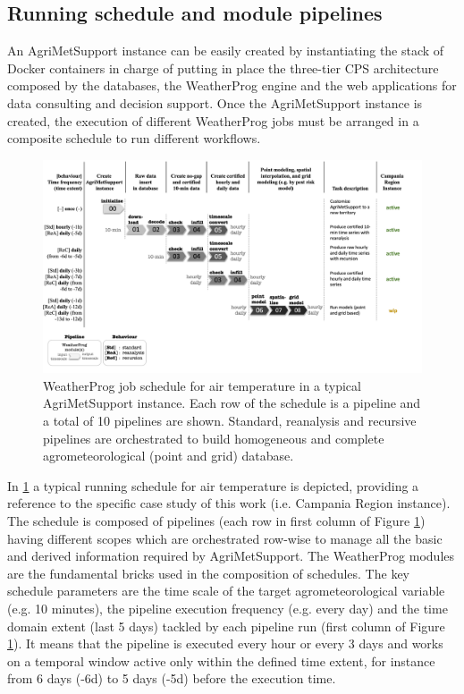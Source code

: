 \documentclass[authoryear,preprint,review,12pt]{elsarticle}
\newcommand{\statusblock}[3]{
    \ifthenelse{\equal{#2}{todo}}
        {\textcolor{red}{#1 (TO DO): #3}}
        {}
    \ifthenelse{\equal{#2}{wip}}
        {\textcolor{magenta}{#1 (IN PROGRESS): #3}}
        {}
    \ifthenelse{\equal{#2}{update}}
        {\textcolor{blue}{#1 (UPDATE): #3}}
        {}
    \ifthenelse{\equal{#2}{review}}
        {\textcolor{cyan}{#1 (REVIEW): #3}}
        {}
    \ifthenelse{\equal{#2}{done}}
        {\textcolor{PineGreen}{#1 (READY): #3}}
        {}
}
\begin{document}
\subsection{ Running schedule and module pipelines }

An Agri\-Met\-Support instance can be easily created by instantiating the stack of Docker containers in charge of putting in place the three-tier CPS architecture composed by the databases, the WeatherProg engine and the web applications for data consulting and decision support.
Once the Agri\-Met\-Support instance is created, the execution of different WeatherProg jobs must be arranged in a composite schedule to run %
different workflows.
\begin{figure}
	\centering %
	\includegraphics[scale=.6, angle=90, trim=0 2cm 7cm 2cm]{Fig06_WeatherProg-schedule-fig-v3.png}
	\caption{WeatherProg job schedule for air temperature in a typical Agri\-Met\-Support instance.
    Each row of the schedule is a pipeline and a total of 10 pipelines are shown.
    Standard, reanalysis and recursive pipelines are orchestrated to build homogeneous and complete agrometeorological (point and grid) database.}
	\label{Fig:weatherprog:calls}
\end{figure}
In \cref{Fig:weatherprog:calls} a typical running schedule for air temperature is depicted, providing a reference to the specific case study of this work (i.e. Campania Region instance).
The schedule is composed of pipelines (each row in first column of Figure \ref{Fig:weatherprog:calls}) having different scopes which are orchestrated row-wise to manage all the basic and derived information required by Agri\-Met\-Support.
The WeatherProg modules are the fundamental bricks used in the composition of schedules.
The key schedule parameters are the time scale of the target agrometeorological variable (e.g. 10 minutes), the pipeline execution frequency (e.g. every day) and the time domain extent (last 5 days) tackled by each pipeline run (first column of Figure \ref{Fig:weatherprog:calls}).
It means that the pipeline is executed every hour or every 3 days and works on a temporal window active only within the defined time extent, for instance from 6 days (-6d) to 5 days (-5d) before the execution time.
\end{document}
